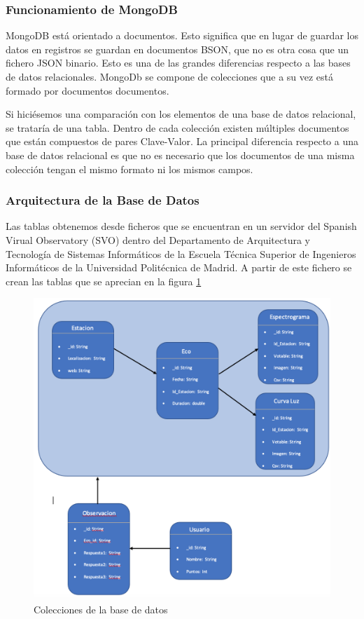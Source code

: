 \subsubsection{Funcionamiento de MongoDB}
MongoDB está orientado a documentos. Esto significa que en lugar de guardar los datos en registros se guardan en documentos BSON, que no es otra cosa que un fichero JSON binario.
Esto es una de las grandes diferencias respecto a las bases de datos relacionales. 
MongoDb se compone de colecciones que a su vez está formado por documentos documentos. 

Si hiciésemos una comparación con los elementos de una base de datos relacional, se trataría de una tabla. Dentro de cada colección existen múltiples documentos que están compuestos de pares Clave-Valor. 
La principal diferencia respecto a una base de datos relacional es que no es necesario que los documentos de una misma colección tengan el mismo formato ni los mismos campos.

\subsubsection{Arquitectura de la Base de Datos}

Las tablas obtenemos desde ficheros que se encuentran en un servidor del Spanish Virual Observatory (SVO) dentro del Departamento de Arquitectura y Tecnología de Sistemas Informáticos de la Escuela Técnica Superior de Ingenieros Informáticos de la Universidad Politécnica de Madrid. A partir de este fichero se crean las tablas que se aprecian en la figura \ref{fig:tablas_base_datos}

\begin{figure}[ht]
    \centering
    \includegraphics[scale=0.6]{include/figuras/Tablas.png}
    \caption{Colecciones de la base de datos}
    \label{fig:tablas_base_datos}
\end{figure}

